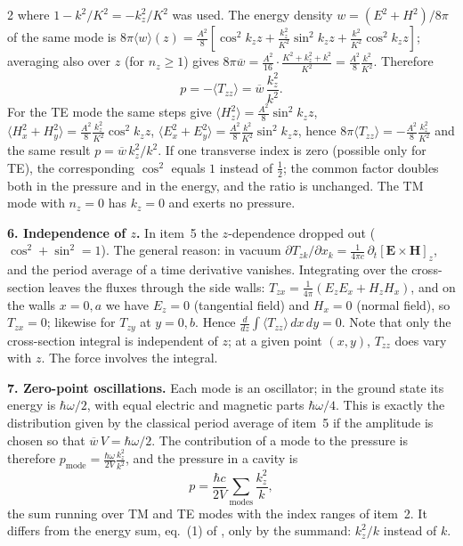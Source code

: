 \documentclass[twoside, 10pt]{article}
\begin{document}
\begin{multicols}{2}
\noindent where $1-k^2/K^2=-k_z^2/K^2$ was used. The energy density
$w=(E^2+H^2)/8\pi$ of the same mode is
$8\pi\langle w\rangle(z)=\frac{A^2}{8}\left[\cos^2k_zz+\frac{k_z^2}{K^2}\sin^2k_zz+\frac{k^2}{K^2}\cos^2k_zz\right]$;
averaging also over $z$ (for $n_z\ge1$) gives
$8\pi\overline w=\frac{A^2}{16}\cdot\frac{K^2+k_z^2+k^2}{K^2}=\frac{A^2}{8}\frac{k^2}{K^2}$.
Therefore
\[
p=-\langle T_{zz}\rangle=\overline w\,\frac{k_z^2}{k^2}.
\]
For the TE mode the same steps give
$\langle H_z^2\rangle=\frac{A^2}{8}\sin^2k_zz$,
$\langle H_x^2+H_y^2\rangle=\frac{A^2}{8}\frac{k_z^2}{K^2}\cos^2k_zz$,
$\langle E_x^2+E_y^2\rangle=\frac{A^2}{8}\frac{k^2}{K^2}\sin^2k_zz$, hence
$8\pi\langle T_{zz}\rangle=-\frac{A^2}{8}\frac{k_z^2}{K^2}$ and the same result
$p=\overline w\,k_z^2/k^2$. If one transverse index is zero (possible only for TE),
the corresponding $\cos^2$ equals $1$ instead of $\tfrac12$; the common factor doubles
both in the pressure and in the energy, and the ratio is unchanged. The TM mode
with $n_z=0$ has $k_z=0$ and exerts no pressure.

\textbf{6. Independence of $z$.} In item~5 the $z$-dependence dropped out
($\cos^2+\sin^2=1$). The general reason: in vacuum
$\partial T_{zk}/\partial x_k=\frac1{4\pi c}\,\partial_t[\mathbf E\times\mathbf H]_z$,
and the period average of a time derivative vanishes. Integrating over the
cross-section leaves the fluxes through the side walls:
$T_{zx}=\frac1{4\pi}(E_zE_x+H_zH_x)$, and on the walls $x=0,a$ we have $E_z=0$
(tangential field) and $H_x=0$ (normal field), so $T_{zx}=0$; likewise for $T_{zy}$
at $y=0,b$. Hence $\frac{d}{dz}\int\langle T_{zz}\rangle\,dx\,dy=0$. Note that only the
cross-section integral is independent of $z$; at a given point $(x,y)$, $T_{zz}$ does
vary with $z$. The force involves the integral.

\textbf{7. Zero-point oscillations.} Each mode is an oscillator; in the ground state
its energy is $\hbar\omega/2$, with equal electric and magnetic parts
$\hbar\omega/4$. This is exactly the distribution given by the classical period
average of item~5 if the amplitude is chosen so that $\overline w\,V=\hbar\omega/2$.
The contribution of a mode to the pressure is therefore
$p_{\text{mode}}=\frac{\hbar\omega}{2V}\frac{k_z^2}{k^2}$, and the pressure in a cavity is
\[
p=\frac{\hbar c}{2V}\sum_{\text{modes}}\frac{k_z^2}{k},
\]
the sum running over TM and TE modes with the index ranges of item~2. It differs
from the energy sum, eq.~(1) of \cite{Drozdov2024}, only by the summand: $k_z^2/k$
instead of $k$.


\end{multicols}
\end{document}
